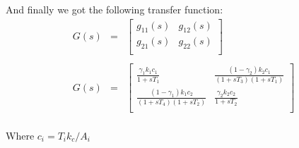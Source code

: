 And finally we got the following transfer function:
\begin{equation}
    \boxed{
        \begin{array}{ccc}
            G(s) & = &
        \left[
            \begin{array}{cc}
                g_{11}(s) & g_{12}(s) \\
                g_{21}(s) & g_{22}(s) \\
            \end{array}
        \right]
        \\
        \\
        G(s) & = &  
        \left[
            \begin{array}{cc}
                \frac{\gamma_1k_1c_1}{1 + sT_1} & \frac{(1-\gamma_2)k_2c_1}{(1+sT_3)(1+sT_1)} \\
                \frac{(1-\gamma_1)k_1c_2}{(1+sT_4)(1+sT_2)} & \frac{\gamma_2k_2c_2}{1 + sT_2} \\
            \end{array}
        \right]
        \\
    \end{array}
    }
\end{equation}

Where $c_i = T_i k_c / A_i$
